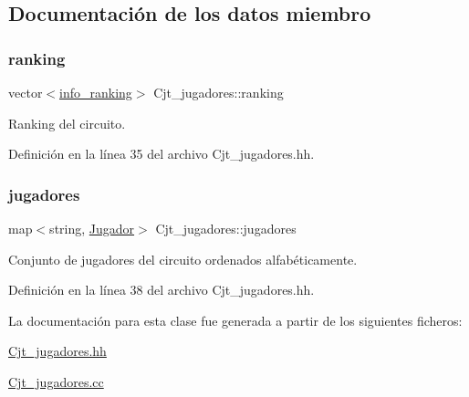 \subsection{Documentación de los datos miembro}
\mbox{\label{class_cjt__jugadores_a2a64dd6a0c9315af038dfdb4c27da059}} 
\subsubsection{\texorpdfstring{ranking}{ranking}}
{\footnotesize\ttfamily vector$<$\hyperlink{struct_cjt__jugadores_1_1info__ranking}{info\+\_\+ranking}$>$ Cjt\+\_\+jugadores\+::ranking\hspace{0.3cm}{\ttfamily [private]}}



Ranking del circuito. 



Definición en la línea 35 del archivo Cjt\+\_\+jugadores.\+hh.

\mbox{\label{class_cjt__jugadores_ae3fc5f98e0f343b039bd7dff0e616ecc}} 
\subsubsection{\texorpdfstring{jugadores}{jugadores}}
{\footnotesize\ttfamily map$<$string, \hyperlink{class_jugador}{Jugador}$>$ Cjt\+\_\+jugadores\+::jugadores\hspace{0.3cm}{\ttfamily [private]}}



Conjunto de jugadores del circuito ordenados alfabéticamente. 



Definición en la línea 38 del archivo Cjt\+\_\+jugadores.\+hh.



La documentación para esta clase fue generada a partir de los siguientes ficheros\+:\begin{DoxyCompactItemize}
\item 
\hyperlink{_cjt__jugadores_8hh}{Cjt\+\_\+jugadores.\+hh}\item 
\hyperlink{_cjt__jugadores_8cc}{Cjt\+\_\+jugadores.\+cc}\end{DoxyCompactItemize}
